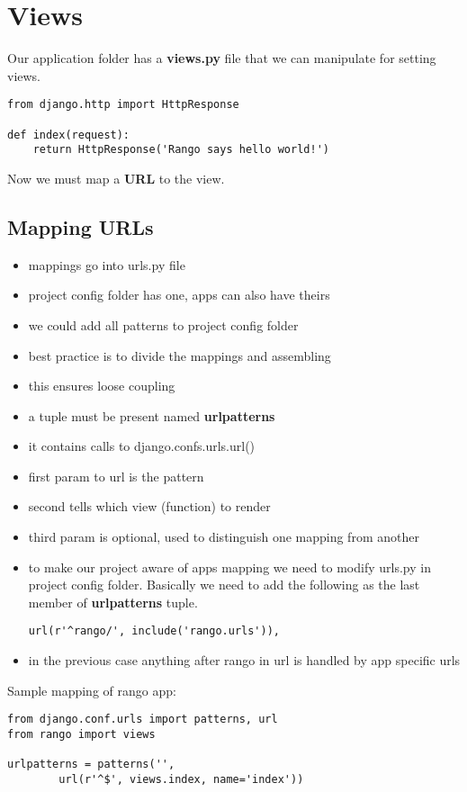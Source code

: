 \documentclass[10pt, a4paper]{article}
\begin{document}
\section{Views}
Our application folder has a \textbf{views.py} file
that we can manipulate for setting views.
\begin{verbatim}
from django.http import HttpResponse

def index(request):
    return HttpResponse('Rango says hello world!')
\end{verbatim}
Now we must map a \textbf{URL} to the view.
\subsection{Mapping URLs}
\begin{itemize}
\item mappings go into urls.py file
\item project config folder has one, apps can also have theirs
\item we could add all patterns to project config folder
\item best practice is to divide the mappings and assembling
\item this ensures loose coupling
\item a tuple must be present named \textbf{urlpatterns}
\item it contains calls to django.confs.urls.url()
\item first param to url is the pattern
\item second tells which view (function) to render
\item third param is optional, used to distinguish one mapping from another
\item to make our project aware of apps mapping we need to modify urls.py
in project config folder. Basically we need to add the following as the 
last member of \textbf{urlpatterns} tuple.
\begin{verbatim}
url(r'^rango/', include('rango.urls')),
\end{verbatim}
\item in the previous case anything after rango in url is handled by app
specific urls
\end{itemize}
Sample mapping of rango app:
\begin{verbatim}
from django.conf.urls import patterns, url
from rango import views

urlpatterns = patterns('',
        url(r'^$', views.index, name='index'))
\end{verbatim}
\end{document}

